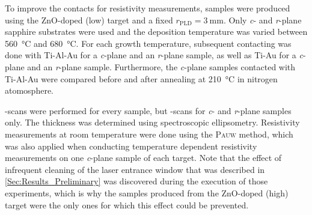 To improve the contacts for resistivity measurements, samples were produced using the ZnO-doped (low) target and a fixed $r_\mathrm{PLD}=\qty{3}{\mm}$.
Only \textit{c}- and \textit{r}-plane sapphire substrates were used and the deposition temperature was varied between \qty{560}{\degreeCelsius} and \qty{680}{\degreeCelsius}.
For each growth temperature, subsequent contacting was done with Ti-Al-Au for a \textit{c}-plane and an \textit{r}-plane sample, as well as Ti-Au for a \textit{c}-plane and an \textit{r}-plane sample.
Furthermore, the \textit{c}-plane samples contacted with Ti-Al-Au were compared before and after annealing at \qty{210}{\degreeCelsius} in nitrogen atomosphere.

\thetaomega-scans were performed for every sample, but \textomega-scans for \textit{c}- and \textit{r}-plane samples only.
The thickness was determined using spectroscopic ellipsometry.
Resistivity measurements at room temperature were done using the \textsc{Pauw} method, which was also applied when conducting temperature dependent resistivity measurements on one \textit{c}-plane sample of each target.
Note that the effect of infrequent cleaning of the laser entrance window that was described in \ref{Sec:Results_Preliminary} was discovered during the execution of those experiments, which is why the samples produced from the ZnO-doped (high) target were the only ones for which this effect could be prevented.